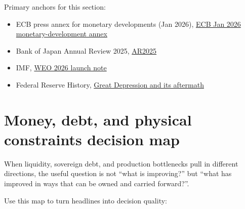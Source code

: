 \documentclass[11pt,openany]{book}
\begin{document}
Primary anchors for this section:
\begin{itemize}
  \item ECB press annex for monetary developments (Jan 2026), \href{https://www.ecb.europa.eu/press/pdf/md/ecb.md2601_annex~df0e665d8e.en.pdf}{ECB Jan 2026 monetary-development annex}
  \item Bank of Japan Annual Review 2025, \href{https://www.boj.or.jp/en/about/activities/act/data/ar2025.pdf}{AR2025}
  \item IMF, \href{https://www.imf.org/en/news/articles/2026/01/21/tr-01212026-weo-press-conference-on-release-of-the-january-2026-world-economic-outlook-update}{WEO 2026 launch note}
  \item Federal Reserve History, \href{https://www.federalreservehistory.org/essays/great-depression-and-its-aftermath}{Great Depression and its aftermath}
\end{itemize}

\section{Money, debt, and physical constraints decision map}

When liquidity, sovereign debt, and production bottlenecks pull in different directions, the useful question is not ``what is improving?'' but ``what has improved in ways that can be owned and carried forward?''.

Use this map to turn headlines into decision quality:
\end{document}
